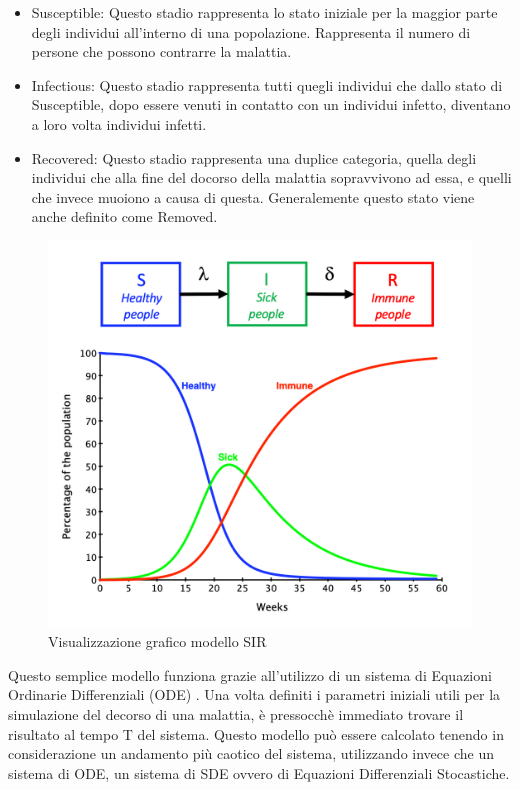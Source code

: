 \begin{itemize}
    \item Susceptible: Questo stadio rappresenta lo stato iniziale per la maggior parte
    degli individui all'interno di una popolazione. Rappresenta il numero di 
    persone che possono contrarre la malattia.
    \item Infectious: Questo stadio rappresenta tutti quegli individui che dallo 
    stato di Susceptible, dopo essere venuti in contatto con un individui infetto, 
    diventano a loro volta individui infetti.
    \item Recovered: Questo stadio rappresenta una duplice categoria, quella degli
    individui che alla fine del docorso della malattia sopravvivono ad essa, e 
    quelli che invece muoiono a causa di questa. Generalemente questo stato viene
    anche definito come Removed.
\end{itemize}

\newpage

\begin{figure}[h]
    \includegraphics[width=\linewidth]{img/SIR-model.png}
    \caption{Visualizzazione grafico modello SIR} 
    \label{fig:SIR_model_graphic}
\end{figure}

Questo semplice modello funziona grazie all'utilizzo di un sistema di Equazioni
Ordinarie Differenziali (ODE) \cite{Brauer2008}. Una volta definiti i parametri iniziali 
utili per la simulazione del decorso di una malattia, è pressocchè immediato trovare
il risultato al tempo T del sistema. Questo modello può essere calcolato tenendo 
in considerazione un andamento più caotico del sistema, utilizzando invece che 
un sistema di ODE, un sistema di SDE \cite{Allen2008} ovvero di Equazioni Differenziali Stocastiche.

